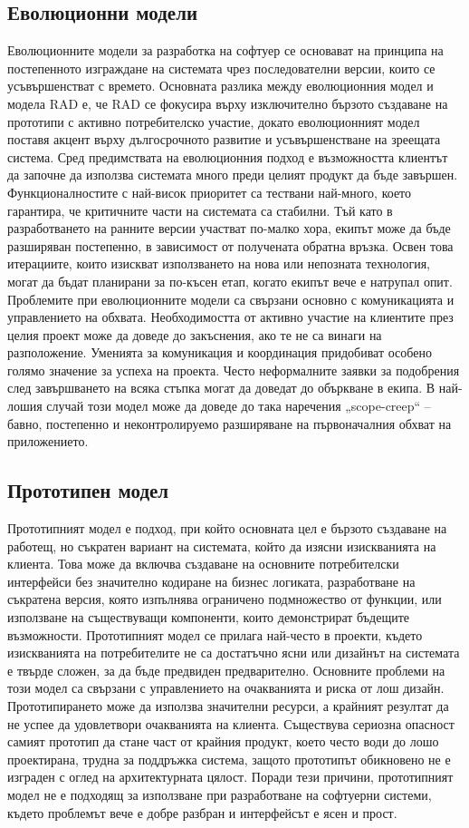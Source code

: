 \documentclass{article}
\renewcommand{\\}{\newline}
\begin{document}
\subsection{Еволюционни модели}
Еволюционните модели за разработка на софтуер се основават на принципа на постепенното изграждане на системата чрез последователни версии, които се усъвършенстват с времето. Основната разлика между еволюционния модел и модела RAD е, че RAD се фокусира върху изключително бързото създаване на прототипи с активно потребителско участие, докато еволюционният модел поставя акцент върху дългосрочното развитие и усъвършенстване на зреещата система. Сред предимствата на еволюционния подход е възможността клиентът да започне да използва системата много преди целият продукт да бъде завършен. Функционалностите с най-висок приоритет са тествани най-много, което гарантира, че критичните части на системата са стабилни. Тъй като в разработването на ранните версии участват по-малко хора, екипът може да бъде разширяван постепенно, в зависимост от получената обратна връзка. Освен това итерациите, които изискват използването на нова или непозната технология, могат да бъдат планирани за по-късен етап, когато екипът вече е натрупал опит. Проблемите при еволюционните модели са свързани основно с комуникацията и управлението на обхвата. Необходимостта от активно участие на клиентите през целия проект може да доведе до закъснения, ако те не са винаги на разположение. Уменията за комуникация и координация придобиват особено голямо значение за успеха на проекта. Често неформалните заявки за подобрения след завършването на всяка стъпка могат да доведат до объркване в екипа. В най-лошия случай този модел може да доведе до така наречения „scope-creep“ – бавно, постепенно и неконтролируемо разширяване на първоначалния обхват на приложението.

\subsection{Прототипен модел}
Прототипният модел е подход, при който основната цел е бързото създаване на работещ, но съкратен вариант на системата, който да изясни изискванията на клиента. Това може да включва създаване на основните потребителски интерфейси без значително кодиране на бизнес логиката, разработване на съкратена версия, която изпълнява ограничено подмножество от функции, или използване на съществуващи компоненти, които демонстрират бъдещите възможности. Прототипният модел се прилага най-често в проекти, където изискванията на потребителите не са достатъчно ясни или дизайнът на системата е твърде сложен, за да бъде предвиден предварително. Основните проблеми на този модел са свързани с управлението на очакванията и риска от лош дизайн. Прототипирането може да използва значителни ресурси, а крайният резултат да не успее да удовлетвори очакванията на клиента. Съществува сериозна опасност самият прототип да стане част от крайния продукт, което често води до лошо проектирана, трудна за поддръжка система, защото прототипът обикновено не е изграден с оглед на архитектурната цялост. Поради тези причини, прототипният модел не е подходящ за използване при разработване на софтуерни системи, където проблемът вече е добре разбран и интерфейсът е ясен и прост.
\end{document}
